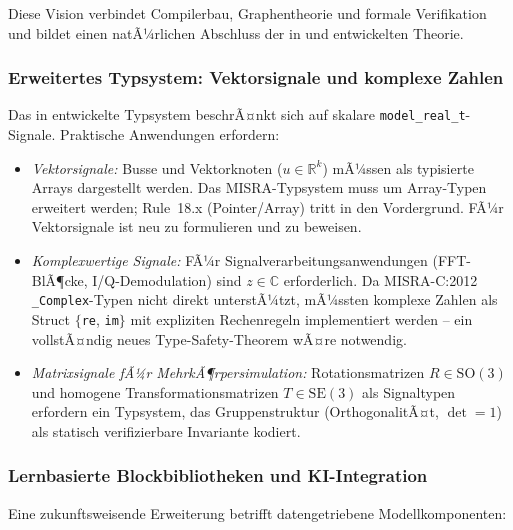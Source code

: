 ﻿\documentclass[12pt,a4paper]{article}
\theoremstyle{definition}
\begin{document}
Diese Vision verbindet Compilerbau, Graphentheorie und formale
Verifikation und bildet einen natÃ¼rlichen Abschluss der in
 und  entwickelten Theorie.

\subsubsection{Erweitertes Typsystem: Vektorsignale und komplexe Zahlen}

Das in  entwickelte Typsystem beschrÃ¤nkt sich auf skalare
\texttt{model\_real\_t}-Signale. Praktische Anwendungen erfordern:

\begin{itemize}
  \item \emph{Vektorsignale:} Busse und Vektorknoten ($u \in \mathbb{R}^k$)
        mÃ¼ssen als typisierte Arrays dargestellt werden. Das MISRA-Typsystem
        muss um Array-Typen erweitert werden; Rule~18.x (Pointer/Array)
        tritt in den Vordergrund. FÃ¼r Vektorsignale ist 
        neu zu formulieren und zu beweisen.

  \item \emph{Komplexwertige Signale:} FÃ¼r Signalverarbeitungsanwendungen
        (FFT-BlÃ¶cke, I/Q-Demodulation) sind $z \in \mathbb{C}$ erforderlich.
        Da MISRA-C:2012 \texttt{\_Complex}-Typen nicht direkt unterstÃ¼tzt,
        mÃ¼ssten komplexe Zahlen als Struct $\{$\texttt{re}, \texttt{im}$\}$
        mit expliziten Rechenregeln implementiert werden -- ein vollstÃ¤ndig
        neues Type-Safety-Theorem wÃ¤re notwendig.

  \item \emph{Matrixsignale fÃ¼r MehrkÃ¶rpersimulation:} Rotationsmatrizen
        $R \in \mathrm{SO}(3)$ und homogene Transformationsmatrizen
        $T \in \mathrm{SE}(3)$ als Signaltypen erfordern ein Typsystem,
        das Gruppenstruktur (OrthogonalitÃ¤t, $\det = 1$) als statisch
        verifizierbare Invariante kodiert.
\end{itemize}

\subsubsection{Lernbasierte Blockbibliotheken und KI-Integration}

Eine zukunftsweisende Erweiterung betrifft datengetriebene Modellkomponenten:
\end{document}
